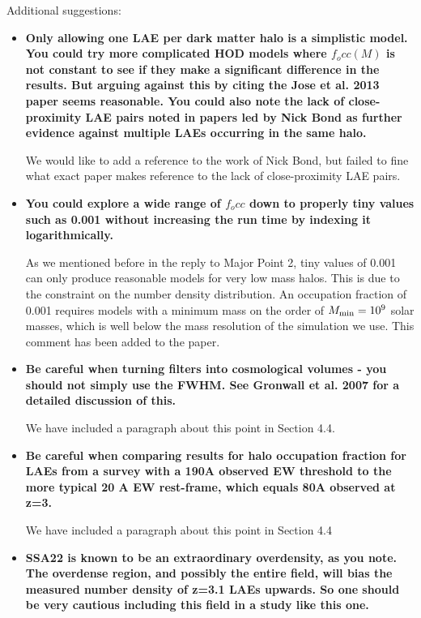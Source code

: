 \documentclass[12pts]{article}
\begin{document}
Additional suggestions:
\begin{itemize}
\item{\bf Only allowing one LAE per dark matter halo is a simplistic model.  You
could try more complicated HOD models where $f_occ(M)$ is not constant
to see if they make a significant difference in the results.  But
arguing against this by citing the Jose et al. 2013 paper seems
reasonable.  You could also note the lack of close-proximity LAE pairs
noted in papers led by Nick Bond as further evidence against multiple
LAEs occurring in the same halo. }

We would like to add a reference to the work of Nick Bond, but failed
to fine what exact paper makes reference to the lack of
close-proximity LAE pairs.

\item{\bf You could explore a wide range of $f_occ$ down to properly tiny values
such as 0.001 without increasing the run time by indexing it
logarithmically.}

As we mentioned before in the reply to Major Point 2, tiny values of
0.001 can only produce reasonable models for very low mass halos. This
is due to the constraint on the number density distribution. An
occupation fraction of 0.001 requires models with a minimum mass on
the order of $M_{\rm min}=10^{9}$ solar masses, which is well below
the mass resolution of the simulation we use. This comment has been
added to the paper.  


\item {\bf Be careful when turning filters into cosmological volumes -
  you should not simply use the FWHM.  See Gronwall et al. 2007 for a detailed
discussion of this.} 

We have included a paragraph about this point in Section 4.4.

\item {\bf Be careful when comparing results for halo occupation fraction for
LAEs from a survey with a 190A observed EW threshold to the more
typical 20 A EW rest-frame, which equals 80A observed at z=3. }

We have included a paragraph about this point in Section 4.4

\item {\bf SSA22 is known to be an extraordinary overdensity, as you note.  The
overdense region, and possibly the entire field, will bias the
measured number density of z=3.1 LAEs upwards.  So one should be very
cautious including this field in a study like this one. }


\end{itemize}
\end{document}
